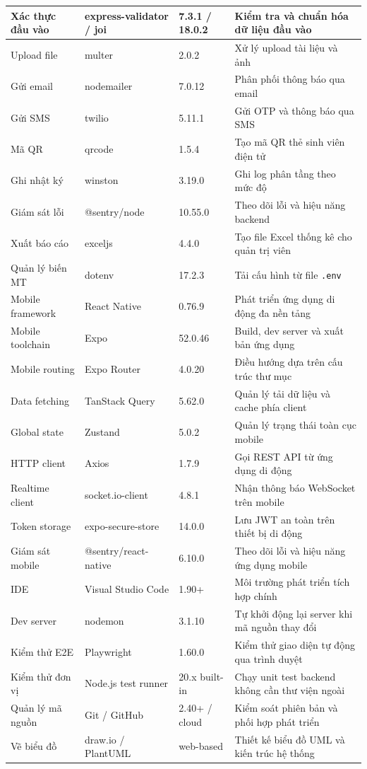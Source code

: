 \documentclass[../DoAn.tex]{subfiles}
\begin{document}
\begin{longtable}{|p{2.4cm}|p{3.6cm}|p{1.6cm}|p{5.2cm}|}
\hline
Xác thực đầu vào & express-validator / joi & 7.3.1 / 18.0.2 & Kiểm tra và chuẩn hóa dữ liệu đầu vào \\
\hline
Upload file & multer & 2.0.2 & Xử lý upload tài liệu và ảnh \\
\hline
Gửi email & nodemailer & 7.0.12 & Phân phối thông báo qua email \\
\hline
Gửi SMS & twilio & 5.11.1 & Gửi OTP và thông báo qua SMS \\
\hline
Mã QR & qrcode & 1.5.4 & Tạo mã QR thẻ sinh viên điện tử \\
\hline
Ghi nhật ký & winston & 3.19.0 & Ghi log phân tầng theo mức độ \\
\hline
Giám sát lỗi & @sentry/node & 10.55.0 & Theo dõi lỗi và hiệu năng backend \\
\hline
Xuất báo cáo & exceljs & 4.4.0 & Tạo file Excel thống kê cho quản trị viên \\
\hline
Quản lý biến MT & dotenv & 17.2.3 & Tải cấu hình từ file \texttt{.env} \\
\hline
Mobile framework & React Native & 0.76.9 & Phát triển ứng dụng di động đa nền tảng \\
\hline
Mobile toolchain & Expo & 52.0.46 & Build, dev server và xuất bản ứng dụng \\
\hline
Mobile routing & Expo Router & 4.0.20 & Điều hướng dựa trên cấu trúc thư mục \\
\hline
Data fetching & TanStack Query & 5.62.0 & Quản lý tải dữ liệu và cache phía client \\
\hline
Global state & Zustand & 5.0.2 & Quản lý trạng thái toàn cục mobile \\
\hline
HTTP client & Axios & 1.7.9 & Gọi REST API từ ứng dụng di động \\
\hline
Realtime client & socket.io-client & 4.8.1 & Nhận thông báo WebSocket trên mobile \\
\hline
Token storage & expo-secure-store & 14.0.0 & Lưu JWT an toàn trên thiết bị di động \\
\hline
Giám sát mobile & @sentry/react-native & 6.10.0 & Theo dõi lỗi và hiệu năng ứng dụng mobile \\
\hline
IDE & Visual Studio Code & 1.90+ & Môi trường phát triển tích hợp chính \\
\hline
Dev server & nodemon & 3.1.10 & Tự khởi động lại server khi mã nguồn thay đổi \\
\hline
Kiểm thử E2E & Playwright & 1.60.0 & Kiểm thử giao diện tự động qua trình duyệt \\
\hline
Kiểm thử đơn vị & Node.js test runner & 20.x built-in & Chạy unit test backend không cần thư viện ngoài \\
\hline
Quản lý mã nguồn & Git / GitHub & 2.40+ / cloud & Kiểm soát phiên bản và phối hợp phát triển \\
\hline
Vẽ biểu đồ & draw.io / PlantUML & web-based & Thiết kế biểu đồ UML và kiến trúc hệ thống \\
\hline
\end{longtable}
\end{document}
